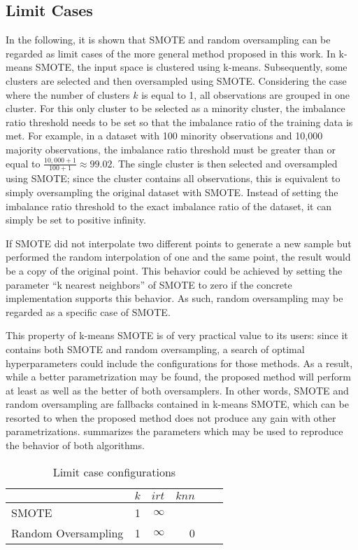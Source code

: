 \documentclass[sort&compress]{elsarticle}
\begin{document}
	\subsection{Limit Cases}
	In the following, it is shown that \ac{SMOTE} and random oversampling can be regarded as limit cases of the more general method proposed in this work. In k-means \ac{SMOTE}, the input space is clustered using k-means. Subsequently, some clusters are selected and then oversampled using \ac{SMOTE}. Considering the case where the number of clusters $k$ is equal to 1, all observations are grouped in one cluster. For this only cluster to be selected as a minority cluster, the imbalance ratio threshold needs to be set so that the imbalance ratio of the training data is met. For example, in a dataset with 100 minority observations and 10,000 majority observations, the imbalance ratio threshold must be greater than or equal to $\frac{10,000 + 1}{100 + 1} \approx 99.02$. The single cluster is then selected and oversampled using \ac{SMOTE}; since the cluster contains all observations, this is equivalent to simply oversampling the original dataset with \ac{SMOTE}. Instead of setting the imbalance ratio threshold to the exact imbalance ratio of the dataset, it can simply be set to positive infinity.

	If \ac{SMOTE} did not interpolate two different points to generate a new sample but performed the random interpolation of one and the same point, the result would be a copy of the original point. This behavior could be achieved by setting the parameter ``k nearest neighbors'' of \ac{SMOTE} to zero if the concrete implementation supports this behavior. As such, random oversampling may be regarded as a specific case of \ac{SMOTE}.

	This property of k-means \ac{SMOTE} is of very practical value to its users: since it contains both \ac{SMOTE} and random oversampling, a search of optimal hyperparameters could include the configurations for those methods. As a result, while a better parametrization may be found, the proposed method will perform at least as well as the better of both oversamplers. In other words, \ac{SMOTE} and random oversampling are fallbacks contained in k-means \ac{SMOTE}, which can be resorted to when the proposed method does not produce any gain with other parametrizations.  summarizes the parameters which may be used to reproduce the behavior of both algorithms.
	\begin{table}[!htb]
		\centering
		\begin{tabular}{lrrrrr}
		\toprule
							& $k$ & $irt$    & $knn$ \\
		\midrule
		\ac{SMOTE}          & 1 & $\infty$ &     \\
		Random Oversampling & 1 & $\infty$ & 0  \\
		\bottomrule
		\end{tabular}
		\caption{Limit case configurations}
		\label{tab:limit-case}
	\end{table}
\end{document}
